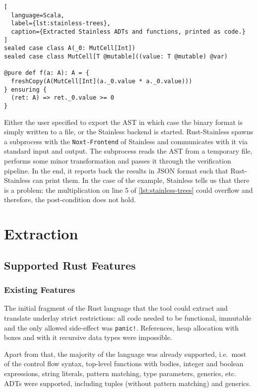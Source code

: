 \begin{lstlisting}[
  language=Scala,
  label={lst:stainless-trees},
  caption={Extracted Stainless ADTs and functions, printed as code.}
]
sealed case class A(_0: MutCell[Int])
sealed case class MutCell[T @mutable]((value: T @mutable) @var)

@pure def f(a: A): A = {
  freshCopy(A(MutCell[Int](a._0.value * a._0.value)))
} ensuring {
  (ret: A) => ret._0.value >= 0
}
\end{lstlisting}

Either the user specified to export the AST in which case the binary format is
simply written to a file, or the Stainless backend is started. Rust-Stainless
spawns a subprocess with the \passthrough{\lstinline!Noxt-Frontend!} of
Stainless and communicates with it via standard input and output. The subprocess
reads the AST from a temporary file, performs some minor transformation and
passes it through the verification pipeline. In the end, it reports back the
results in JSON format such that Rust-Stainless can print them. In the case of
the example, Stainless tells us that there is a problem: the multiplication on
line 5 of \autoref{lst:stainless-trees} could overflow and therefore, the
post-condition does not hold.



\section{Extraction}

\subsection{Supported Rust Features}
\label{sec:supported-features}

\subsubsection{Existing Features}

The initial fragment of the Rust language that the tool could extract
and translate underlay strict restrictions: all code needed to be
functional, immutable and the only allowed side-effect was
\passthrough{\lstinline"panic!"}. References, heap allocation with boxes
and with it recursive data types were impossible.

Apart from that, the majority of the language was already supported, i.e.~most
of the control flow syntax, top-level functions with bodies, integer and boolean
expressions, string literals, pattern matching, type parameters, generics, etc.
ADTs were supported, including tuples (without pattern matching) and generics.

